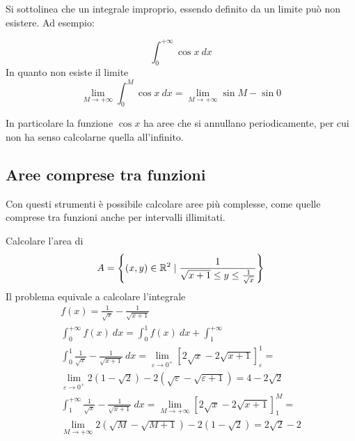 Si sottolinea che un integrale improprio, essendo definito da un limite può non esistere. Ad esempio:
\begin{examp}
	\[
		\int_0^{+\infty}\cos x~dx
	\]
	In quanto non esiste il limite
	\[
		\lim_{M\to+\infty}\int_0^M\cos x~dx=\lim_{M\to+\infty}\sin M-\sin 0
	\]
\end{examp}
In particolare la funzione $\cos x$ ha aree che si annullano periodicamente, per cui non ha senso calcolarne quella all'infinito.


\subsection{Aree comprese tra funzioni}
Con questi strumenti è possibile calcolare aree più complesse, come quelle comprese tra funzioni anche per intervalli illimitati.
\begin{examp}
	Calcolare l'area di
	\[
		A=\left\{(x,y)\in\mathbb{R}^2\mid\frac{1}{\sqrt{x+1}\leq y\leq \frac{1}{\sqrt{x}}}\right\}
	\]
	Il problema equivale a calcolare l'integrale
	\begin{gather*}
		f(x)=\frac{1}{\sqrt{x}}-\frac{1}{\sqrt{x+1}}\\
		\int_0^{+\infty} f(x)~dx=\int_0^1 f(x)~dx+\int_1^{+\infty}\\
		\int_0^1 \frac{1}{\sqrt{x}}-\frac{1}{\sqrt{x+1}}~dx=\lim_{\varepsilon\to0^+} [2\sqrt{x}-2\sqrt{x+1}]_\varepsilon^1 =\\[1ex] \lim_{\varepsilon\to0^+} 2(1-\sqrt2)-2(\sqrt\varepsilon-\sqrt{\varepsilon+1})=4-2\sqrt{2}\\
		\int_1^{+\infty}\frac{1}{\sqrt{x}}-\frac{1}{\sqrt{x+1}}~dx = \lim_{M\to+\infty} [2\sqrt{x}-2\sqrt{x+1}]_1^M =\\[1ex]
		\lim_{M\to+\infty} 2(\sqrt{M}-\sqrt{M+1})-2(1-\sqrt{2})=2\sqrt{2}-2
	\end{gather*}
\end{examp}
